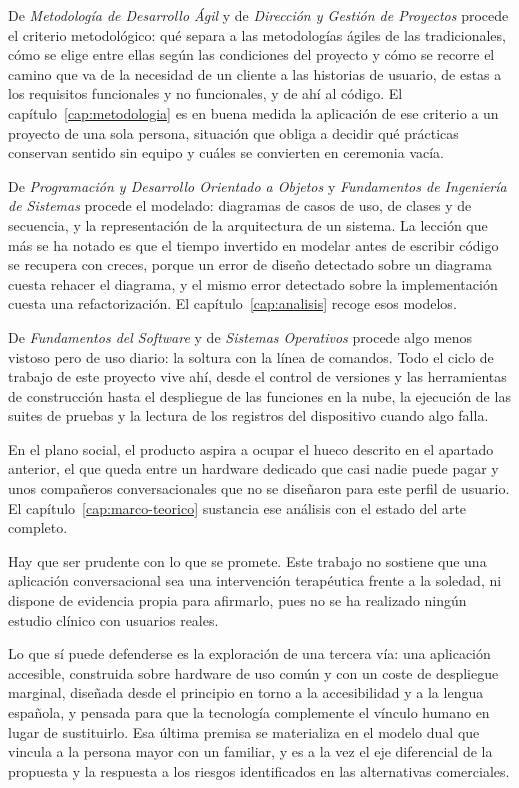 De \textit{Metodología de Desarrollo Ágil} y de \textit{Dirección y Gestión de Proyectos} procede el criterio
metodológico: qué separa a las metodologías ágiles de las tradicionales, cómo se elige entre ellas según las
condiciones del proyecto y cómo se recorre el camino que va de la necesidad de un cliente a las historias de
usuario, de estas a los requisitos funcionales y no funcionales, y de ahí al código. El
capítulo~\ref{cap:metodologia} es en buena medida la aplicación de ese criterio a un proyecto de una sola
persona, situación que obliga a decidir qué prácticas conservan sentido sin equipo y cuáles se convierten en
ceremonia vacía.

De \textit{Programación y Desarrollo Orientado a Objetos} y \textit{Fundamentos de Ingeniería de Sistemas} procede el modelado: diagramas de casos de uso, de
clases y de secuencia, y la representación de la arquitectura de un sistema. La lección que más se ha notado
es que el tiempo invertido en modelar antes de escribir código se recupera con creces, porque un error de
diseño detectado sobre un diagrama cuesta rehacer el diagrama, y el mismo error detectado sobre la
implementación cuesta una refactorización. El capítulo~\ref{cap:analisis} recoge esos modelos.

De \textit{Fundamentos del Software} y de \textit{Sistemas Operativos} procede algo menos vistoso pero de uso
diario: la soltura con la línea de comandos. Todo el ciclo de trabajo de este proyecto vive ahí, desde el
control de versiones y las herramientas de construcción hasta el despliegue de las funciones en la nube, la
ejecución de las suites de pruebas y la lectura de los registros del dispositivo cuando algo falla.

En el plano social, el producto aspira a ocupar el hueco descrito en el apartado anterior, el que queda entre
un hardware dedicado que casi nadie puede pagar y unos compañeros conversacionales que no se diseñaron para
este perfil de usuario. El capítulo~\ref{cap:marco-teorico} sustancia ese análisis con el estado del arte
completo.

Hay que ser prudente con lo que se promete. Este trabajo no sostiene que una aplicación conversacional sea
una intervención terapéutica frente a la soledad, ni dispone de evidencia propia para afirmarlo, pues no se
ha realizado ningún estudio clínico con usuarios reales.

Lo que sí puede defenderse es la exploración de una tercera vía: una aplicación accesible, construida sobre
hardware de uso común y con un coste de despliegue marginal, diseñada desde el principio en torno a la
accesibilidad y a la lengua española, y pensada para que la tecnología complemente el vínculo humano en lugar
de sustituirlo. Esa última premisa se materializa en el modelo dual que vincula a la persona mayor con un
familiar, y es a la vez el eje diferencial de la propuesta y la respuesta a los riesgos identificados en las
alternativas comerciales.

